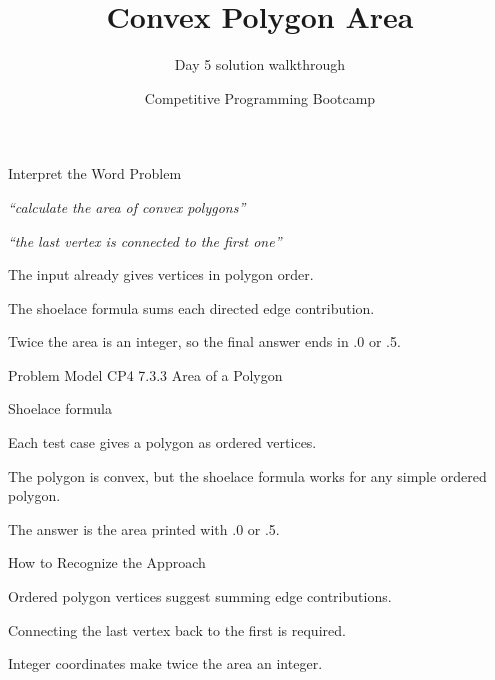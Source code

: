 \documentclass[aspectratio=169,11pt]{beamer}
\title[convexpolygonarea]{Convex Polygon Area}
\subtitle{Day 5 solution walkthrough}
\author[Solution Deck]{Competitive Programming Bootcamp}
\date{}
\begin{document}
\begin{frame}[plain]
  \titlepage
\end{frame}

\begin{frame}{Interpret the Word Problem}
\small
{}
\begin{tightitemize}
  \item \textit{``calculate the area of convex polygons''}
  \item \textit{``the last vertex is connected to the first one''}
\end{tightitemize}

\vspace{0.18cm}
\begin{tightitemize}
  \item The input already gives vertices in polygon order.
  \item The shoelace formula sums each directed edge contribution.
  \item Twice the area is an integer, so the final answer ends in .0 or .5.
\end{tightitemize}
\end{frame}







\begin{frame}{Problem Model}
\small
{} CP4 7.3.3 Area of a Polygon

\vspace{0.25cm}
 Shoelace formula

\vspace{0.25cm}
\begin{tightitemize}
  \item Each test case gives a polygon as ordered vertices.
  \item The polygon is convex, but the shoelace formula works for any simple ordered polygon.
  \item The answer is the area printed with .0 or .5.
\end{tightitemize}
\end{frame}

\begin{frame}{How to Recognize the Approach}
\begin{tightitemize}
  \item Ordered polygon vertices suggest summing edge contributions.
  \item Connecting the last vertex back to the first is required.
  \item Integer coordinates make twice the area an integer.
\end{tightitemize}
\end{frame}
\end{document}
